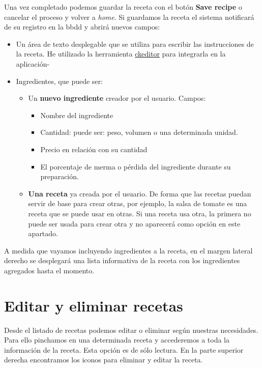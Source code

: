 Una vez completado podemos guardar la receta con el botón \textbf{Save recipe} o cancelar el proceso y volver a \emph{home}. Si guardamos la receta el sistema notificará de su registro en la bbdd y abrirá nuevos campos: 

\begin{itemize}
	\item Un área de texto desplegable que se utiliza para escribir las instrucciones de la receta. He utilizado la herramienta \href{http://ckeditor.com/}{ckeditor} para integrarla en la aplicación-
	\item Ingredientes, que puede ser:
		\begin{itemize}
			\item Un \textbf{nuevo ingrediente} creador por el usuario. Campos:
				\begin{itemize}
					\item Nombre del ingrediente
					\item Cantidad: puede ser: peso, volumen o una determinada unidad.
					\item Precio en relación con su cantidad
					\item El porcentaje de merma o pérdida del ingrediente durante su preparación.
				\end{itemize}
			\item \textbf{Una receta} ya creada por el usuario. De forma que las recetas puedan servir de base para crear otras, por ejemplo, la salsa de tomate es una receta que se puede usar en otras. Si una receta usa otra, la primera no puede ser usada para crear otra y no aparecerá como opción en este apartado.
		\end{itemize}
\end{itemize}

A medida que vayamos incluyendo ingredientes a la receta, en el margen lateral derecho se desplegará una lista informativa de la receta con los ingredientes agregados hasta el momento.

\vspace*{0.2in}
\section{Editar y eliminar recetas}\label{cap.2.3}

\vspace*{0.1in}
Desde el listado de recetas podemos editar o eliminar según nuestras necesidades. Para ello pinchamos en una determinada receta y accederemos a toda la información de la receta. Esta opción es de sólo lectura. En la parte superior derecha encontramos los iconos para eliminar y editar la receta. \\

